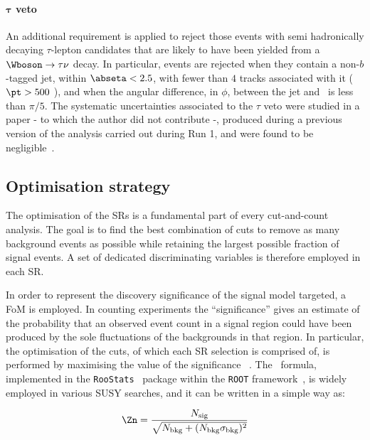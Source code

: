 			\paragraph{$\mathbf{\tau}$ veto}

				An additional requirement is applied to reject those events with semi hadronically decaying $\tau$-lepton candidates that are likely to have been yielded from a $\Wboson\to\tau\nu$ decay. In particular, events are rejected when they contain a non-$b$-tagged jet, within $\abseta < 2.5$, with fewer than $4$ tracks associated with it ($\pt > 500$ \MeV), and when the angular difference, in $\phi$, between the jet and \ptmiss\ is less than $\pi/5$. The systematic uncertainties associated to the $\tau$ veto were studied in a paper - to which the author did not contribute -, produced during a previous version of the analysis carried out during Run 1, and were found to be negligible~\cite{stop0LRun1}.



		\subsection{Optimisation strategy}

			The optimisation of the \acp{SR} is a fundamental part of every cut-and-count analysis. The goal is to find the best combination of cuts to remove as many background events as possible while retaining the largest possible fraction of signal events. A set of dedicated discriminating variables is therefore employed in each \ac{SR}.

			In order to represent the discovery significance of the signal model targeted, a \ac{FoM} is employed. In counting experiments the ``significance'' gives an estimate of the probability that an observed event count in a signal region could have been produced by the sole fluctuations of the backgrounds in that region. In particular, the optimisation of the cuts, of which each \ac{SR} selection is comprised of, is performed by maximising the value of the significance \Zn~\cite{Zn}. The \Zn\ formula, implemented in the \verb+RooStats+~\cite{2010acat.confE..57M} package within the \verb+ROOT+ framework~\cite{Brun:1997pa}, is widely employed in various \ac{SUSY} searches, and it can be written in a simple way as: 

			\begin{equation}
				\Zn = \frac{N_\mathrm{sig}}{\sqrt{ N_\mathrm{bkg} + (N_\mathrm{bkg}\sigma_\mathrm{bkg})^2}}
				\label{eq:Zn_forumla}
			\end{equation} 

